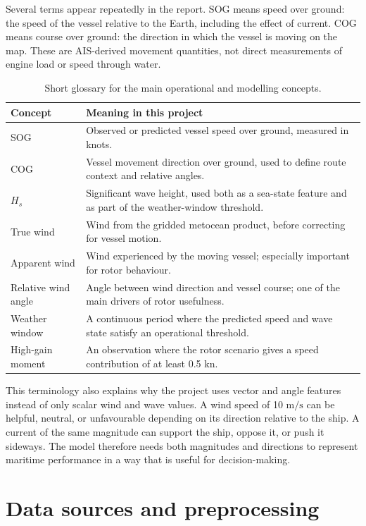 \documentclass[10pt,a4paper]{article}
\newcommand{\kn}{\ensuremath{\mathrm{kn}}}
\newcommand{\ms}{\ensuremath{\mathrm{m/s}}}
\newcommand{\hs}{$H_s$}
\newcommand{\sog}{SOG}
\newcommand{\cog}{COG}
\begin{document}
Several terms appear repeatedly in the report. \sog{} means speed over ground:
the speed of the vessel relative to the Earth, including the effect of current.
\cog{} means course over ground: the direction in which the vessel is moving on
the map. These are AIS-derived movement quantities, not direct measurements of
engine load or speed through water.

\begin{table}[H]
\centering
\caption{Short glossary for the main operational and modelling concepts.}
\begin{tabularx}{\textwidth}{>{\raggedright\arraybackslash}p{}X}
\toprule
\textbf{Concept} & \textbf{Meaning in this project} \\
\midrule
\sog{} & Observed or predicted vessel speed over ground, measured in knots. \\
\cog{} & Vessel movement direction over ground, used to define route context and relative angles. \\
\hs{} & Significant wave height, used both as a sea-state feature and as part of the weather-window threshold. \\
True wind & Wind from the gridded metocean product, before correcting for vessel motion. \\
Apparent wind & Wind experienced by the moving vessel; especially important for rotor behaviour. \\
Relative wind angle & Angle between wind direction and vessel course; one of the main drivers of rotor usefulness. \\
Weather window & A continuous period where the predicted speed and wave state satisfy an operational threshold. \\
High-gain moment & An observation where the rotor scenario gives a speed contribution of at least 0.5 \kn{}. \\
\bottomrule
\end{tabularx}
\end{table}

This terminology also explains why the project uses vector and angle features
instead of only scalar wind and wave values. A wind speed of 10 \ms{} can be
helpful, neutral, or unfavourable depending on its direction relative to the
ship. A current of the same magnitude can support the ship, oppose it, or push
it sideways. The model therefore needs both magnitudes and directions to
represent maritime performance in a way that is useful for decision-making.


\section{Data sources and preprocessing}
\end{document}
